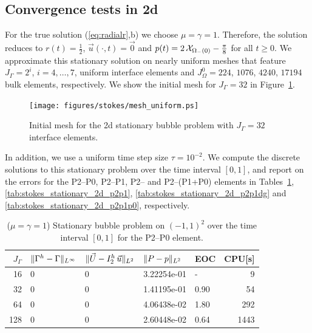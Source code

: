 \subsection{Convergence tests in 2d} \label{sec:stokes_2d_convergence_results}
For the true solution (\ref{eq:radialr},b) we choose $\mu = \gamma = 1$.
Therefore, the solution reduces to $r(t) =
\frac{1}{2}$, $\vec u(\cdot, t) = \vec 0$ and $p(t) = 2\,\mathrm{\mathcal{X}}_{\Omega_-(0)} -
\frac{\pi}{8}$ for all $t \geq 0$. We approximate this stationary solution on
nearly uniform meshes that feature $J_\Gamma = 2^i$, $i=4,\ldots,7$, uniform
interface elements and $J_\Omega^0 = 224$, $1076$, $4240$, $17194$ bulk
elements, respectively. We show the initial mesh for $J_\Gamma = 32$ in
Figure~\ref{fig:meshes_uniform}.
\begin{figure}[htbp]
\centering
\texttt{[image: figures/stokes/mesh\_uniform.ps]}
\caption[Stokes 2d stationary bubble initial mesh]
{Initial mesh for the 2d stationary bubble problem with $J_\Gamma = 32$
interface elements.}
\label{fig:meshes_uniform}
\end{figure}
In addition, we use a uniform time step size $\tau=10^{-2}$.
We compute the discrete solutions to this stationary problem over the time
interval $[0,1]$, and report on the errors for the P2--P0, P2--P1, P2--\pdg
and P2--(P1+P0) elements in Tables~\ref{tab:stokes_stationary_2d_p2p0},
\ref{tab:stokes_stationary_2d_p2p1}, \ref{tab:stokes_stationary_2d_p2p1dg} and
\ref{tab:stokes_stationary_2d_p2p1p0}, respectively.
\begin{table}
\center
\begin{tabular}{rllllr}
\hline
$J_\Gamma$ & $\|\Gamma^h - \Gamma\|_{L^\infty}$ & $\|\vec U - I^h_{2}\,\vec u\|_{L^2}$ & $\|P - p\|_{L^2}$ & EOC & CPU[s] \\
\hline
 16 & 0 & 0 & 3.22254e-01 &    - &    9 \\
 32 & 0 & 0 & 1.41195e-01 & 0.90 &   54 \\
 64 & 0 & 0 & 4.06438e-02 & 1.80 &  292 \\
128 & 0 & 0 & 2.60448e-02 & 0.64 & 1443 \\
\hline
\end{tabular}
\caption[Stokes 2d stationary bubble errors P2--P0]
{($\mu=\gamma=1$) Stationary bubble problem on $(-1,1)^2$ over the time
interval $[0,1]$ for the P2--P0 element.}
\label{tab:stokes_stationary_2d_p2p0}
\end{table}
